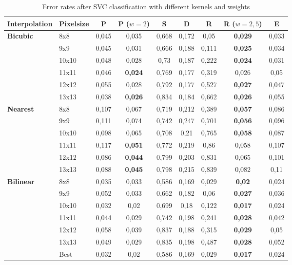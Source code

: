 \documentclass{article}
\begin{document}
\begin{table}[H]
  \small
  \centering
    \begin{tabular}{l|l|ccccccc|}
    \hline
    Interpolation & Pixelsize & P     & P ($w=2$) & S     & D     & R     & R ($w=2,5$) & E \\ 
    \hline
    \textbf{Bicubic} & 8x8   & 0,045 & 0,035 & 0,668 & 0,172 & 0,05  & \textbf{0,029} & 0,033 \\
    \textbf{} & 9x9   & 0,045 & 0,031 & 0,666 & 0,188 & 0,111 & \textbf{0,025} & 0,034 \\
    \textbf{} & 10x10 & 0,048 & 0,028 & 0,73  & 0,187 & 0,222 & \textbf{0,024} & 0,031 \\
    \textbf{} & 11x11 & 0,046 & \textbf{0,024} & 0,769 & 0,177 & 0,319 & 0,026 & 0,05 \\
    \textbf{} & 12x12 & 0,055 & 0,028 & 0,792 & 0,177 & 0,527 & \textbf{0,027} & 0,047 \\
    \textbf{} & 13x13 & 0,038 & \textbf{0,026} & 0,834 & 0,184 & 0,662 & \textbf{0,026} & 0,055 \\ \hline
    \textbf{Nearest} & 8x8   & 0,107 & 0,067 & 0,719 & 0,212 & 0,389 & \textbf{0,057} & 0,086 \\
    \textbf{} & 9x9   & 0,111 & 0,074 & 0,742 & 0,247 & 0,701 & \textbf{0,056} & 0,096 \\
    \textbf{} & 10x10 & 0,098 & 0,065 & 0,708 & 0,21  & 0,765 & \textbf{0,058} & 0,087 \\
    \textbf{} & 11x11 & 0,117 & \textbf{0,051} & 0,772 & 0,219 & 0,86  & 0,058 & 0,107 \\
    \textbf{} & 12x12 & 0,086 & \textbf{0,044} & 0,799 & 0,203 & 0,831 & 0,065 & 0,101 \\
    \textbf{} & 13x13 & 0,088 & \textbf{0,045} & 0,798 & 0,215 & 0,839 & 0,082 & 0,11 \\ \hline
    \textbf{Bilinear} & 8x8   & 0,035 & 0,033 & 0,586 & 0,169 & 0,029 & \textbf{0,02} & 0,024 \\
    \textbf{} & 9x9   & 0,052 & 0,033 & 0,662 & 0,182 & 0,06  & \textbf{0,027} & 0,036 \\
    \textbf{} & 10x10 & 0,032 & 0,02  & 0,699 & 0,18  & 0,122 & \textbf{0,017} & 0,024 \\
    \textbf{} & 11x11 & 0,044 & 0,029 & 0,742 & 0,198 & 0,241 & \textbf{0,028} & 0,042 \\
    \textbf{} & 12x12 & 0,058 & 0,039 & 0,837 & 0,188 & 0,315 & \textbf{0,029} & 0,05 \\
    \textbf{} & 13x13 & 0,049 & 0,029 & 0,835 & 0,198 & 0,487 & \textbf{0,028} & 0,052 \\ \hline
    \textbf{} & Best  & 0,032 & 0,02  & 0,586 & 0,169 & 0,029 & \textbf{0,017} & 0,024 \\
    \hline
    \end{tabular}
  \caption{Error rates after SVC classification with different kernels and weights} \label{table: error rate SVC}
\end{table}%
\end{document}
